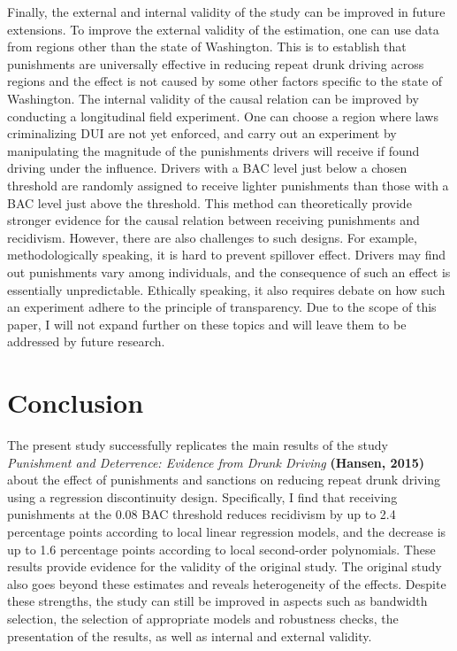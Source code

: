 \documentclass[
  11pt,
]{article}
\begin{document}
Finally, the external and internal validity of the study can be improved
in future extensions. To improve the external validity of the
estimation, one can use data from regions other than the state of
Washington. This is to establish that punishments are universally
effective in reducing repeat drunk driving across regions and the effect
is not caused by some other factors specific to the state of Washington.
The internal validity of the causal relation can be improved by
conducting a longitudinal field experiment. One can choose a region
where laws criminalizing DUI are not yet enforced, and carry out an
experiment by manipulating the magnitude of the punishments drivers will
receive if found driving under the influence. Drivers with a BAC level
just below a chosen threshold are randomly assigned to receive lighter
punishments than those with a BAC level just above the threshold. This
method can theoretically provide stronger evidence for the causal
relation between receiving punishments and recidivism. However, there
are also challenges to such designs. For example, methodologically
speaking, it is hard to prevent spillover effect. Drivers may find out
punishments vary among individuals, and the consequence of such an
effect is essentially unpredictable. Ethically speaking, it also
requires debate on how such an experiment adhere to the principle of
transparency. Due to the scope of this paper, I will not expand further
on these topics and will leave them to be addressed by future research.

\hypertarget{conclusion}{%
\section{Conclusion}\label{conclusion}}

The present study successfully replicates the main results of the study
\emph{Punishment and Deterrence: Evidence from Drunk Driving}
\textbf{(Hansen, 2015)} about the effect of punishments and sanctions on
reducing repeat drunk driving using a regression discontinuity design.
Specifically, I find that receiving punishments at the 0.08 BAC
threshold reduces recidivism by up to 2.4 percentage points according to
local linear regression models, and the decrease is up to 1.6 percentage
points according to local second-order polynomials. These results
provide evidence for the validity of the original study. The original
study also goes beyond these estimates and reveals heterogeneity of the
effects. Despite these strengths, the study can still be improved in
aspects such as bandwidth selection, the selection of appropriate models
and robustness checks, the presentation of the results, as well as
internal and external validity.
\end{document}
